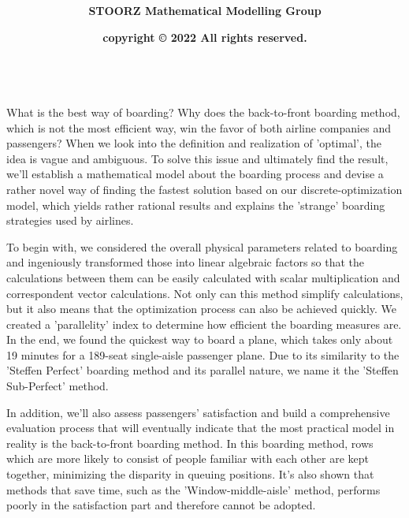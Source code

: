 \documentclass{article}
\title{\Huge\textbf{\color{allandarkblue}\Title}}
\author{\textbf{STOORZ Mathematical Modelling Group}}
\date{\textbf{copyright © 2022 All rights reserved.}}
\theoremstyle{definition}
\theoremstyle{remark}
\numberwithin{equation}{section}
\begin{document}
	\maketitle
	\newpage

	\normalfont{}\selectfont

	\qquad
	\par
	~~
	\\[1.5cm]

	What is the best way of boarding? Why does the back-to-front boarding method, which is not the most efficient way, win the favor of both airline companies and passengers? When we look into the definition and realization of 'optimal', the idea is vague and ambiguous. To solve this issue and ultimately find the result, we'll establish a mathematical model about the boarding process and devise a rather novel way of finding the fastest solution based on our discrete-optimization model, which yields rather rational results and explains the 'strange' boarding strategies used by airlines.

	To begin with, we considered the overall physical parameters related to boarding and ingeniously transformed those into linear algebraic factors so that the calculations between them can be easily calculated with scalar multiplication and correspondent vector calculations. Not only can this method simplify calculations, but it also means that the optimization process can also be achieved quickly. We created a 'parallelity' index to determine how efficient the boarding measures are. In the end, we found the quickest way to board a plane, which takes only about 19 minutes for a 189-seat single-aisle passenger plane. Due to its similarity to the 'Steffen Perfect' boarding method and its parallel nature, we name it the 'Steffen Sub-Perfect' method.

	In addition, we'll also assess passengers' satisfaction and build a comprehensive evaluation process that will eventually indicate that the most practical model in reality is the back-to-front boarding method. In this boarding method, rows which are more likely to consist of people familiar with each other are kept together, minimizing the disparity in queuing positions. It's also shown that methods that save time, such as the 'Window-middle-aisle' method, performs poorly in the satisfaction part and therefore cannot be adopted.
\end{document}

